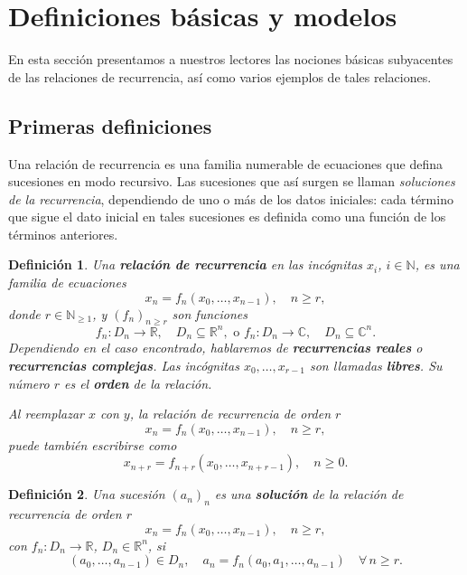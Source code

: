 \documentclass{amsart}
\newtheorem{definition}{Definición}
\begin{document}
\section{Definiciones básicas y modelos}
En esta sección presentamos a nuestros lectores las nociones básicas subyacentes de las relaciones de recurrencia, así como varios ejemplos de tales relaciones.
\subsection{Primeras definiciones}
Una relación de recurrencia es una familia numerable de ecuaciones que defina sucesiones en modo recursivo. Las sucesiones que así surgen se llaman \emph{soluciones de la recurrencia}, dependiendo de uno o más de los datos iniciales: cada término que sigue el dato inicial en tales sucesiones es definida como una función de los términos anteriores.

\begin{definition}
	Una \textbf{relación de recurrencia} en las incógnitas $x_{i}$, $i\in\mathbb{N}$, es una familia de ecuaciones \[ x_{n}=f_{n}\left(x_{0},\ldots,x_{n-1}\right),\quad n\geq r, \] donde $r\in\mathbb{N}_{\geq1}$, y ${\left(f_{n}\right)}_{n\geq r}$ son funciones \[ f_{n}\colon D_{n}\rightarrow\mathbb{R},\quad D_{n}\subseteq\mathbb{R}^{n},\text{ o }f_{n}\colon D_{n}\rightarrow\mathbb{C},\quad D_{n}\subseteq\mathbb{C}^{n}. \] Dependiendo en el caso encontrado, hablaremos de \textbf{recurrencias reales} o \textbf{recurrencias complejas}. Las incógnitas $x_{0},\ldots,x_{r-1}$ son llamadas \textbf{libres}. Su número $r$ es el \textbf{orden} de la relación.
	
	Al reemplazar $x$ con $y$, la relación de recurrencia de orden $r$ \[ x_{n}=f_{n}\left(x_{0},\ldots,x_{n-1}\right),\quad n\geq r, \] puede también escribirse como \[ x_{n+r}=f_{n+r}\left(x_{0},\ldots,x_{n+r-1}\right),\quad n\geq0. \]
\end{definition}

\begin{definition}
	Una sucesión ${\left(a_{n}\right)}_{n}$ es una \textbf{solución} de la relación de recurrencia de orden $r$
	\begin{equation}
	x_{n}=f_{n}\left(x_{0},\ldots,x_{n-1}\right),\quad n\geq r,
	\end{equation}
	con $f_{n}\colon D_{n}\rightarrow\mathbb{R}$, $D_{n}\in\mathbb{R}^{n}$, si \[ \left(a_{0},\ldots,a_{n-1}\right)\in D_{n},\quad a_{n}=f_{n}\left(a_{0},a_{1},\ldots,a_{n-1}\right)\quad\forall\,n\geq r. \]
\end{definition}
\end{document}
